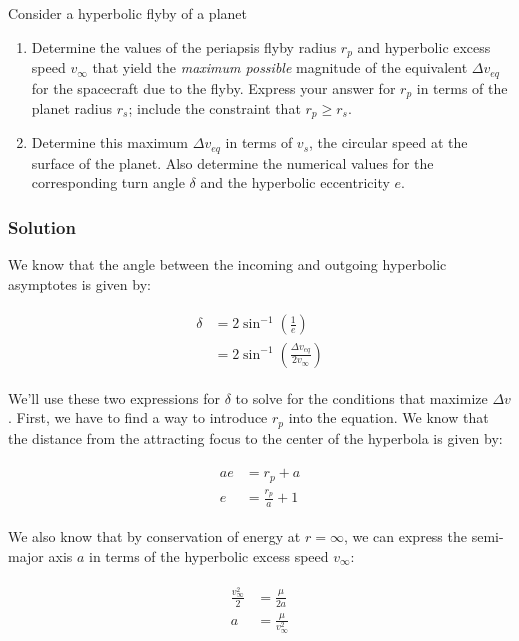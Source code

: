 \documentclass[
]{article}
\providecommand{\tightlist}{%
  \setlength{\itemsep}{0pt}\setlength{\parskip}{0pt}}
\begin{document}
Consider a hyperbolic flyby of a planet

\begin{enumerate}
\tightlist
\item
  Determine the values of the periapsis flyby radius \(r_p\) and
  hyperbolic excess speed \(v_\infty\) that yield the \emph{maximum
  possible} magnitude of the equivalent \(\Delta v_{eq}\) for the
  spacecraft due to the flyby. Express your answer for \(r_p\) in terms
  of the planet radius \(r_s\); include the constraint that
  \(r_p \geq r_s\).
\item
  Determine this maximum \(\Delta v_{eq}\) in terms of \(v_s\), the
  circular speed at the surface of the planet. Also determine the
  numerical values for the corresponding turn angle \(\delta\) and the
  hyperbolic eccentricity \(e\).
\end{enumerate}

\subsubsection{Solution}\label{solution-3}

We know that the angle between the incoming and outgoing hyperbolic
asymptotes is given by:

\[\begin{aligned}
\begin{aligned}
    \delta &= 2 \sin^{-1} \left( \frac{1}{e} \right) \\
    &= 2 \sin^{-1} \left( \frac{\Delta v_{eq}}{2 v_\infty} \right)
\end{aligned}
\end{aligned}\]

We'll use these two expressions for \(\delta\) to solve for the
conditions that maximize \(\Delta v\). First, we have to find a way to
introduce \(r_p\) into the equation. We know that the distance from the
attracting focus to the center of the hyperbola is given by:

\[\begin{aligned}
\begin{aligned}
    ae &= r_p + a \\
    e &= \frac{r_p}{a} + 1
\end{aligned}
\end{aligned}\]

We also know that by conservation of energy at \(r=\infty\), we can
express the semi-major axis \(a\) in terms of the hyperbolic excess
speed \(v_\infty\):

\[\begin{aligned}
\begin{aligned}
    \frac{v_\infty^2}{2} &= \frac{\mu}{2a} \\
    a &= \frac{\mu}{v_\infty^2}
\end{aligned}
\end{aligned}\]
\end{document}
